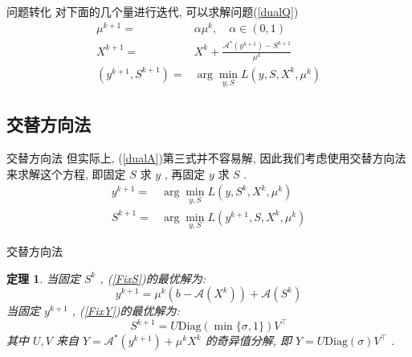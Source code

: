 \documentclass[slidestop,compress,mathserif,UTF8]{beamer}
\newtheorem{theo}{\bf \textcolor[rgb]{0.8,0,0}{定理}}[section]  %
\numberwithin{equation}{section}
\begin{document}
            \begin{frame}[t]{问题转化}
                对下面的几个量进行迭代, 可以求解问题(\ref{dualQ})
                \begin{equation}
                    \begin{split}\label{dualA}
                            \mu^{k + 1}
                        =	& \alpha \mu^k, \quad \alpha \in (0,1)\\
                            X^{k + 1}
                        =	& X^k + \frac{\mathcal{A}^*(y^{k + 1}) - S^{k + 1}}{\mu^k}\\
                            (y^{k + 1}, S^{k + 1}) 
                        =	& \arg \min_{y, S}L(y, S, X^k, \mu^k)
                    \end{split}
                \end{equation}
            \end{frame}
        \subsection{交替方向法}
            \begin{frame}[t]{交替方向法}
                但实际上, (\ref{dualA})第三式并不容易解, 因此我们考虑使用交替方向法来求解这个方程, 即固定 $S$ 求 $y$ , 再固定 $y$ 求 $S$ .
                \begin{align}
                        y^{k + 1}
                    =	& \arg \min_{y, S}L(y, S^k, X^k, \mu^k) \label{FixS}\\
                        S^{k + 1}
                    =	& \arg \min_{y, S}L(y^{k + 1}, S, X^k, \mu^k) \label{FixY}
                \end{align}
            \end{frame}
            \begin{frame}[t]{交替方向法}
                \begin{theo}
                    当固定 $S^k$ , (\ref{FixS})的最优解为:
                        \begin{equation}\label{dualAY}
                            y^{k + 1} = \mu^k(b - \mathcal{A}(X^k)) + \mathcal{A}(S^k)
                        \end{equation}
                    当固定 $y^{k + 1}$ , (\ref{FixY})的最优解为:
                        \begin{equation}\label{dualAS}
                            S^{k + 1} = U \text{Diag}(\min \{\sigma, 1\}) V^\top
                        \end{equation}
                    其中 $U, V$ 来自 $Y = \mathcal{A}^*(y^{k + 1}) + \mu^k X^k$ 的奇异值分解, 即 $Y = U \text{Diag}(\sigma) V^\top$ .
                \end{theo}
            \end{frame}
\end{document}
